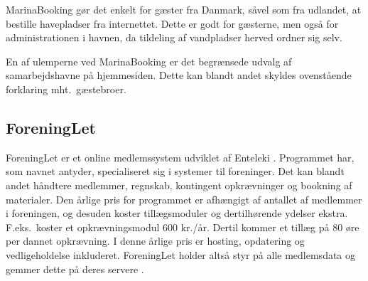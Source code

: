 MarinaBooking gør det enkelt for gæster fra Danmark, såvel som fra udlandet, at bestille havepladser fra internettet. Dette er godt for gæsterne, men også for administrationen i havnen, da tildeling af vandpladser herved ordner sig selv.

En af ulemperne ved MarinaBooking er det begrænsede udvalg af samarbejdshavne på hjemmesiden. Dette kan blandt andet skyldes ovenstående forklaring mht.\ gæstebroer.








\subsection{ForeningLet} %
\label{sub:ForeningLet}

ForeningLet er et online medlemssystem udviklet af Enteleki \cite{foreninglet}. Programmet har, som navnet antyder, specialiseret sig i systemer til foreninger. Det kan blandt andet håndtere medlemmer, regnskab, kontingent opkrævninger og bookning af materialer. Den årlige pris for programmet er afhængigt af antallet af medlemmer i foreningen, og desuden koster tillægsmoduler og dertilhørende ydelser ekstra. F.eks.\ koster et opkrævningsmodul 600 kr./år. Dertil kommer et tillæg på 80 øre per dannet opkrævning. I denne årlige pris er hosting, opdatering og vedligeholdelse inkluderet. ForeningLet holder altså styr på alle medlemsdata og gemmer dette på deres servere \cite{foreninglet}.

